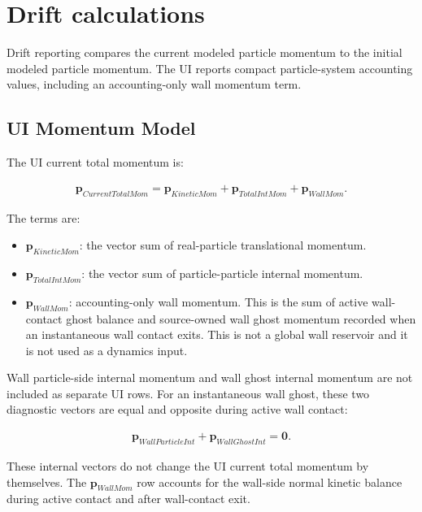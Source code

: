 \section{Drift calculations}

Drift reporting compares the current modeled particle momentum to the initial
modeled particle momentum.  The UI reports compact particle-system accounting
values, including an accounting-only wall momentum term.

\subsection{UI Momentum Model}

The UI current total momentum is:

\begin{equation}
\begin{aligned}
\mathbf{p}_{CurrentTotalMom}
=
\mathbf{p}_{KineticMom}
+
\mathbf{p}_{TotalIntMom}
+
\mathbf{p}_{WallMom}.
\end{aligned}
\end{equation}

The terms are:

\begin{itemize}
\item \(\mathbf{p}_{KineticMom}\): the vector sum of real-particle
translational momentum.
\item \(\mathbf{p}_{TotalIntMom}\): the vector sum of particle-particle
internal momentum.
\item \(\mathbf{p}_{WallMom}\): accounting-only wall momentum.  This is the
sum of active wall-contact ghost balance and source-owned wall ghost momentum
recorded when an instantaneous wall contact exits.  This is not a global wall
reservoir and it is not used as a dynamics input.
\end{itemize}

Wall particle-side internal momentum and wall ghost internal momentum are not
included as separate UI rows.  For an instantaneous wall ghost, these two
diagnostic vectors are equal and opposite during active wall contact:

\begin{equation}
\begin{aligned}
\mathbf{p}_{WallParticleInt}
+
\mathbf{p}_{WallGhostInt}
=
\mathbf{0}.
\end{aligned}
\end{equation}

These internal vectors do not change the UI current total momentum by
themselves.  The \(\mathbf{p}_{WallMom}\) row accounts for the wall-side
normal kinetic balance during active contact and after wall-contact exit.

